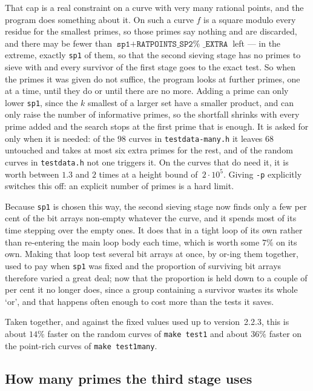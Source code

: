 \documentclass[12pt,a4paper,oneside]{amsart}
\begin{document}
That cap is a real constraint on a curve with very many rational points, and
the program does something about it. On such a curve $f$ is a square modulo
every residue for the smallest primes, so those primes say nothing and are
discarded, and there may be fewer than $\texttt{sp1} + \texttt{RATPOINTS\_SP2%
\_EXTRA}$ left --- in the extreme, exactly \texttt{sp1} of them, so that the
second sieving stage has no primes to sieve with and every survivor of the
first stage goes to the exact test. So when the primes it was given do not
suffice, the program looks at further primes, one at a time, until they do or
until there are no more. Adding a prime can only lower \texttt{sp1}, since the
$k$ smallest of a larger set have a smaller product, and can only raise the
number of informative primes, so the shortfall shrinks with every prime added
and the search stops at the first prime that is enough. It is asked for only
when it is needed: of the $98$ curves in \texttt{testdata-many.h} it leaves
$68$ untouched and takes at most six extra primes for the rest, and of the
random curves in \texttt{testdata.h} not one triggers it. On the curves that
do need it, it is worth between $1.3$ and $2$ times at a height bound
of~$2\cdot 10^5$. Giving \verb+-p+ explicitly switches this off: an explicit
number of primes is a hard limit.

Because \texttt{sp1} is chosen this way, the second sieving stage now finds
only a few per cent of the bit arrays non-empty whatever the curve, and it
spends most of its time stepping over the empty ones. It does that in a tight
loop of its own rather than re-entering the main loop body each time, which is
worth some $7\%$ on its own. Making that loop test several
bit arrays at once, by or-ing them together, used to pay when \texttt{sp1} was
fixed and the proportion of surviving bit arrays therefore varied a great deal;
now that the proportion is held down to a couple of per cent it no longer does,
since a group containing a survivor wastes its whole `or', and that happens
often enough to cost more than the tests it saves.

Taken together, and against the fixed values used up to version~2.2.3, this is
about $14\%$ faster on the random curves of \texttt{make test1} and about
$36\%$ faster on the point-rich curves of \texttt{make test1many}.

\subsection{How many primes the third stage uses}\label{sec:sp3choice}
\end{document}
